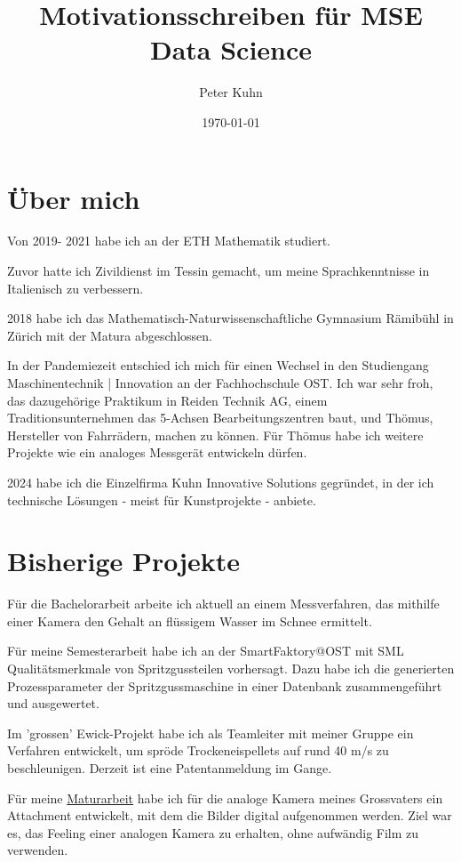 \documentclass[a4paper,12pt]{article}
\begin{document}
\title{Motivationsschreiben für MSE Data Science}
\author{Peter Kuhn}
\date{\today}
\maketitle

\section{Über mich}
Von 2019- 2021 habe ich an der ETH Mathematik studiert.

Zuvor hatte ich Zivildienst im Tessin gemacht, um meine Sprachkenntnisse in Italienisch zu verbessern.

2018 habe ich das Mathematisch-Naturwissenschaftliche Gymnasium Rämibühl in Zürich mit der Matura abgeschlossen.


 In der Pandemiezeit entschied ich mich für einen Wechsel in den Studiengang Maschinentechnik | Innovation an der Fachhochschule OST. Ich war sehr froh, das dazugehörige Praktikum in Reiden Technik AG, einem Traditionsunternehmen das 5-Achsen Bearbeitungszentren baut, und Thömus, Hersteller von Fahrrädern,  machen zu können. Für Thömus habe ich weitere Projekte wie ein analoges Messgerät entwickeln dürfen.
 
2024 habe ich die Einzelfirma Kuhn Innovative Solutions gegründet, in der ich technische Lösungen - meist für Kunstprojekte - anbiete. 

\section{Bisherige Projekte}

Für die Bachelorarbeit arbeite ich aktuell an einem Messverfahren, das mithilfe einer Kamera den Gehalt an flüssigem Wasser im Schnee ermittelt.


Für meine Semesterarbeit habe ich an der SmartFaktory@OST mit SML Qualitätsmerkmale von Spritzgussteilen vorhersagt. Dazu habe ich die generierten Prozessparameter der Spritzgussmaschine in einer Datenbank  zusammengeführt und ausgewertet.


Im 'grossen' Ewick-Projekt habe ich als Teamleiter mit meiner Gruppe ein Verfahren entwickelt, um spröde Trockeneispellets auf rund 40 m/s zu beschleunigen. Derzeit ist eine Patentanmeldung im Gange. 

Für meine \href{http://peterkuhn.ch/Maturarbeit20170120.pdf}{Maturarbeit} habe ich für die analoge Kamera meines Grossvaters ein Attachment entwickelt, mit dem die Bilder digital aufgenommen werden. Ziel war es, das Feeling einer analogen Kamera zu erhalten, ohne aufwändig Film zu verwenden.
\end{document}
